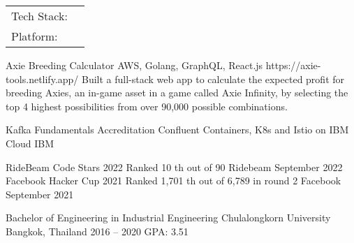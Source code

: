 \documentclass[]{awesome-cv}
\begin{document}
\begin{cventries}
	\cventry
	{}
	{\def\arraystretch{1.15}{\begin{tabular}{ l l }
				Tech Stack: & {\skill{ Golang, MongoDB, SQL, React.js, TypeScript}} \\
				Platform:   & {\skill{ AWS, OpenShift, Docker, Control-M}}          \\
			\end{tabular}}}
	{}
	{}
	{}
\end{cventries}

\vspace{-7mm}
\begin{cventries}
	\cventry
	{}
	{Axie Breeding Calculator}
	{AWS, Golang, GraphQL, React.js}
	{https://axie-tools.netlify.app/}
	{Built a full-stack web app to calculate the expected profit for breeding Axies, an in-game asset in a game called Axie Infinity, by selecting the top 4 highest possibilities from over 90,000 possible combinations.}

	\vspace{-5mm}
\end{cventries}

\begin{cventries}
	\cventry
	{}
	{Kafka Fundamentals Accreditation}
	{Confluent}
	{}
	{}
	\cventry
	{}
	{Containers, K8s and Istio on IBM Cloud}
	{IBM}
	{}
	{}
\end{cventries}

\begin{cvhonors}
	\cvhonor
	{RideBeam Code Stars 2022}
	{Ranked 10 th out of 90}
	{Ridebeam}
	{September 2022}
	\cvhonor
	{Facebook Hacker Cup 2021}
	{Ranked 1,701 th out of 6,789 in round 2}
	{Facebook}
	{September 2021}
\end{cvhonors}
\begin{cventries}
	\cventry
	{Bachelor of Engineering in Industrial Engineering}
	{Chulalongkorn University}
	{Bangkok, Thailand}
	{2016 – 2020}
	{GPA: 3.51}
\end{cventries}

\vspace{-2mm}
\
\end{document}

